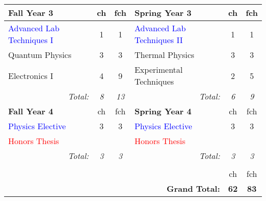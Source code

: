 \documentclass[12pt,preprint]{aastex}
\newcommand{\red}[1]{\textcolor{red}{#1}}
\newcommand{\blue}[1]{\textcolor{blue}{#1}}
\begin{document}
\begin{longtable}{lcclcc}
\hline
{\bf Fall Year 3} & {\sc ch} & {\sc fch} & {\bf Spring Year 3} & {\sc ch} & {\sc fch}  \\ 
\hline
\hline
\blue{Advanced Lab Techniques I} & 1 & 1 & \blue{Advanced Lab Techniques II} & 1 & 1 \\
Quantum Physics                  & 3 & 3 & Thermal Physics                   & 3 & 3 \\
Electronics I                    & 4 & 9 & Experimental Techniques           & 2 & 5 \\
\multicolumn{1}{r}{\emph{Total:}} & \emph{8} & \emph{13} &
\multicolumn{1}{r}{\emph{Total:}} & \emph{6}  & \emph{9} \\

\hline
{\bf Fall Year 4} & {\sc ch} & {\sc fch} & {\bf Spring Year 4} & {\sc ch} & {\sc fch} \\ 
\hline
\hline
\blue{Physics Elective} & 3 & 3 & \blue{Physics Elective}  & 3 & 3 \\
\red{Honors Thesis} &   &   & \red{Honors Thesis}  &  &  \\
\multicolumn{1}{r}{\emph{Total:}} & \emph{3} & \emph{3} &
\multicolumn{1}{r}{\emph{Total:}} & \emph{3}  & \emph{3} \\
\hline \\
 &   &   &  & {\sc ch} & {\sc fch} \\  
 &   &   & \multicolumn{1}{r}{{\bf Grand Total:}} & {\bf 62} & {\bf 83} \\  
\end{longtable}

\end{document}
